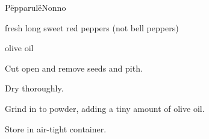 \begin{recipe}{Pëpparulë}{Nonno}{}

\begin{ingredients}
\item fresh long sweet red peppers (not bell peppers)
\item olive oil
\end{ingredients}

\begin{directions}
\item Cut open and remove seeds and pith.
\item Dry thoroughly.
\item Grind in to powder, adding a tiny amount of olive oil.
\item Store in air-tight container.
\end{directions}

\end{recipe}
